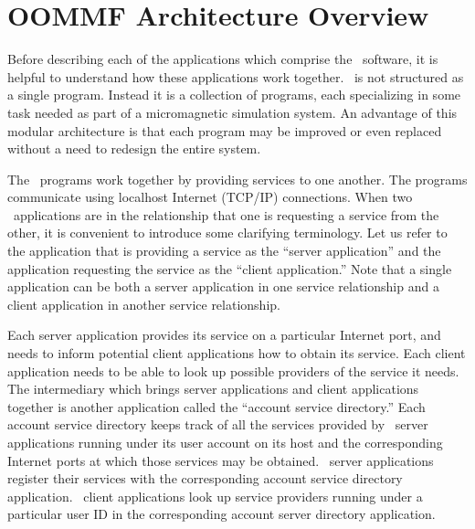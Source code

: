 
\chapter{OOMMF Architecture Overview}\label{sec:arch}

Before describing each of the applications which comprise
the \OOMMF\ software, it is helpful to understand how these
applications work together.  \OOMMF\ is not structured as
a single program.  Instead it is a collection of programs,
each specializing in some task needed as part of a
micromagnetic simulation system.  An advantage of this modular
architecture is that each program may be improved or even replaced 
without a need to redesign the entire system.

The \OOMMF\  programs work together by providing services
to one another.  
The programs communicate using localhost Internet
(TCP/IP) connections.
When two \OOMMF\ applications are in
the relationship that one is requesting a service from the other,
it is convenient to introduce some clarifying terminology.  Let
us refer to the application that is providing a service as
the ``server application'' and the application requesting the
service as the ``client application.''  
Note that a single application
can be both a server application in one service relationship and a 
client application in another service relationship.  

Each server application provides its service on a particular
Internet port, and needs to inform potential client applications 
how to obtain its service.  Each client application needs to be able
to look up possible providers of the service it needs.  The
intermediary which brings server applications and client applications
together is another application called the 
``account service directory.''
Each account service directory keeps track of all the services provided
by \OOMMF\ server applications running under its user account on its
host and the corresponding Internet ports at which those services
may be obtained.
\OOMMF\ server applications register their services with
the corresponding account service directory application.  \OOMMF\
client applications look up service providers running under a 
particular user ID in the corresponding account server directory 
application.  

